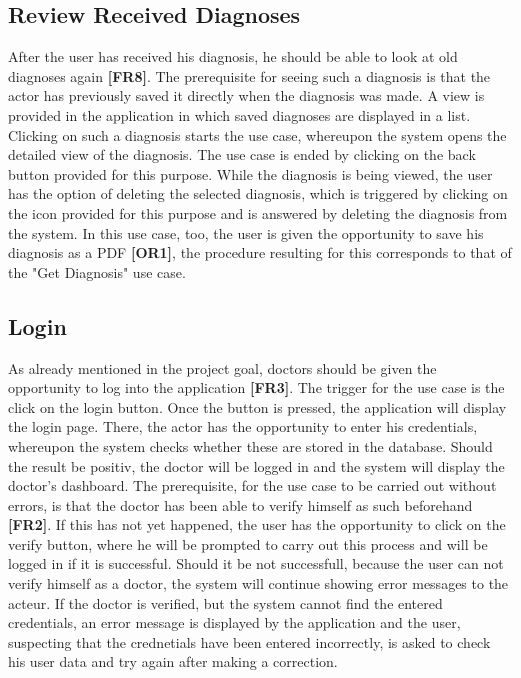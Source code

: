 \subsection{Review Received Diagnoses}
After the user has received his diagnosis, he should be able to look at old diagnoses again \textbf{[FR8]}. The prerequisite for seeing such a diagnosis is that the actor has previously saved it directly when the diagnosis was made. A view is provided in the application in which saved diagnoses are displayed in a list. Clicking on such a diagnosis starts the use case, whereupon the system opens the detailed view of the diagnosis. The use case is ended by clicking on the back button provided for this purpose. While the diagnosis is being viewed, the user has the option of deleting the selected diagnosis, which is triggered by clicking on the icon provided for this purpose and is answered by deleting the diagnosis from the system. In this use case, too, the user is given the opportunity to save his diagnosis as a PDF \textbf{[OR1]}, the procedure resulting for this corresponds to that of the "Get Diagnosis" use case.

\subsection{Login}
As already mentioned in the project goal, doctors should be given the opportunity to log into the application \textbf{[FR3]}. The trigger for the use case is the click on the login button. Once the button is pressed, the application will display the login page. There, the actor has the opportunity to enter his credentials, whereupon the system checks whether these are stored in the database. Should the result be positiv, the doctor will be logged in and the system will display the doctor's dashboard. The prerequisite, for the use case to be carried out without errors, is that the doctor has been able to verify himself as such beforehand \textbf{[FR2]}. If this has not yet happened, the user has the opportunity to click on the verify button, where he will be prompted to carry out this process and will be logged in if it is successful. Should it be not successfull, because the user can not verify himself as a doctor, the system will continue showing error messages to the acteur.  If the doctor is verified, but the system cannot find the entered credentials, an error message is displayed by the application and the user, suspecting that the crednetials have been entered incorrectly, is asked to check his user data and try again after making a correction.

